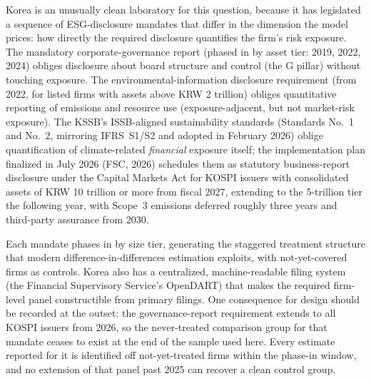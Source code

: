 \documentclass[11pt,a4paper]{article}
\begin{document}
Korea is an unusually clean laboratory for this question, because it has legislated a sequence of ESG-disclosure mandates that differ in the dimension the model prices: how directly the required disclosure quantifies the firm's risk exposure. The mandatory corporate-governance report (phased in by asset tier: 2019, 2022, 2024) obliges disclosure about board structure and control (the G pillar) without touching exposure. The environmental-information disclosure requirement (from 2022, for listed firms with assets above KRW 2 trillion) obliges quantitative reporting of emissions and resource use (exposure-adjacent, but not market-risk exposure). The KSSB's ISSB-aligned sustainability standards (Standards No.~1 and No.~2, mirroring IFRS~S1/S2 and adopted in February 2026) oblige quantification of climate-related \emph{financial} exposure itself; the implementation plan finalized in July 2026 (FSC, 2026) schedules them as statutory business-report disclosure under the Capital Markets Act for KOSPI issuers with consolidated assets of KRW 10 trillion or more from fiscal 2027, extending to the 5-trillion tier the following year, with Scope~3 emissions deferred roughly three years and third-party assurance from 2030.

Each mandate phases in by size tier, generating the staggered treatment structure that modern difference-in-differences estimation exploits, with not-yet-covered firms as controls. Korea also has a centralized, machine-readable filing system (the Financial Supervisory Service's OpenDART) that makes the required firm-level panel constructible from primary filings. One consequence for design should be recorded at the outset: the governance-report requirement extends to all KOSPI issuers from 2026, so the never-treated comparison group for that mandate ceases to exist at the end of the sample used here. Every estimate reported for it is identified off not-yet-treated firms within the phase-in window, and no extension of that panel past 2025 can recover a clean control group.
\end{document}
